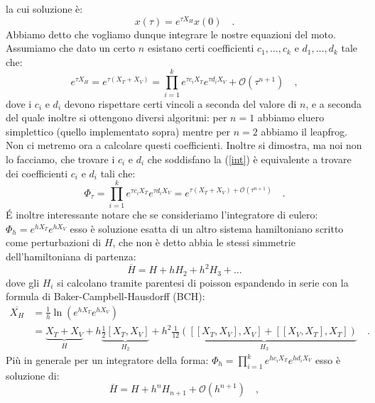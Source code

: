 \documentclass[10pt,a4paper]{article}
\begin{document}
la cui soluzione è:
\begin{equation}
x(\tau) = e^{\tau X_H} x(0) \quad.
\end{equation}
Abbiamo detto che vogliamo dunque integrare le nostre equazioni del moto. Assumiamo che dato un certo $n$ esistano certi coefficienti $c_1, \dots, c_k$ e $d_1, \dots, d_k$ tale che:
\begin{equation}\label{int}
e^{\tau X_H} = e^{\tau(X_T + X_V)} = \prod_{i=1}^k e^{\tau c_i X_T}e^{\tau d_i X_V} + \mathcal{O}(\tau^{n+1}) \quad,
\end{equation}
dove i $c_i$ e $d_i$ devono rispettare certi vincoli a seconda del valore di $n$, e a seconda del quale inoltre si ottengono diversi algoritmi: per $n=1$ abbiamo eluero simplettico (quello implementato sopra) mentre per $n=2$ abbiamo il leapfrog. Non ci metremo ora a calcolare questi coefficienti. Inoltre si dimostra, ma noi non lo facciamo, che trovare i $c_i$ e $d_i$ che soddisfano la (\ref{int}) è equivalente a trovare dei coefficienti $c_i$ e $d_i$ tali che:
\begin{equation}
\Phi_{\tau} = \prod_{i=1}^k e^{\tau c_i X_T}e^{\tau d_i X_V} = e^{\tau(X_T + X_V) + \mathcal{O}(\tau^{n+1})} \quad.
\end{equation}
\' E inoltre interessante notare che se consideriamo l'integratore di eulero: $\Phi_h = e^{h X_T}e^{h X_V}$ esso è soluzione esatta di un altro sistema hamiltoniano scritto come perturbazioni di $H$, che non è detto abbia le stessi simmetrie dell'hamiltoniana di partenza:
\begin{equation}
\overline{H} = H + hH_2 + h^2H_3 + \dots 
\end{equation}
dove gli $H_i$ si calcolano tramite parentesi di poisson espandendo in serie con la formula di Baker-Campbell-Hausdorff (BCH):
\begin{equation}
\begin{split}
\overline{X_H} &= \frac{1}{h} \ln(e^{h X_T}e^{h X_V}) \\
&= \underbrace{X_T + X_V}_{H} + h \underbrace{\frac{1}{2}[X_T, X_V]}_{H_2} + h^2 \underbrace{\frac{1}{12}([[X_T, X_V], X_V] + [[X_V, X_T], X_T])}_{H_3}  \quad .
\end{split}
\end{equation}
Più in generale per un integratore della forma: $\Phi_{h} = \prod_{i=1}^k e^{h c_i X_T}e^{h d_i X_V}$ esso è soluzione di:
\begin{equation}
\overline{H} = H + h^n H_{n+1} + \mathcal{O}(h^{n+1}) \quad,
\end{equation}
\end{document}
